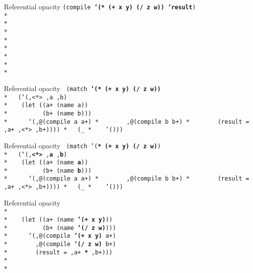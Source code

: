 \begin{frame}{Referential opacity}
  \texttt{(compile \textbf{'(* (+ x y) (/ z w)) 'result})\\*
    \ \\*
    \ \\*
    \ \\*
    \ \\*
    \ \\*
    \ \\*
    \ \\*
    \ }
\end{frame}

\begin{frame}{Referential opacity}
  \texttt{
    (match \textbf{'(* (+ x y) (/ z w))}\\*
    \ \ (`(,<*> ,a ,b)\\*
    \ \ \ (let ((a+ (name a))\\*
    \ \ \ \ \ \ \ \ \ (b+ (name b)))\\*
    \ \ \ \ \ `(,@(compile a a+)\\*
    \ \ \ \ \ \ \ ,@(compile b b+)\\*
    \ \ \ \ \ \ \ (\textbf{result} = ,a+ ,<*> ,b+))))\\*
    \ \ (\_\\*
    \ \ \ '()))
}
\end{frame}

\begin{frame}{Referential opacity}
  \texttt{
    (match '(\textbf{*} \textbf{(+ x y)} \textbf{(/ z w)})\\*
    \ \ (`(,\textbf{<*>} ,\textbf{a} ,\textbf{b})\\*
    \ \ \ (let ((a+ (name \textbf{a}))\\*
    \ \ \ \ \ \ \ \ \ (b+ (name \textbf{b})))\\*
    \ \ \ \ \ `(,@(compile \textbf{a} a+)\\*
    \ \ \ \ \ \ \ ,@(compile \textbf{b} b+)\\*
    \ \ \ \ \ \ \ (result = ,a+ ,\textbf{<*>} ,b+))))\\*
    \ \ (\_\\*
    \ \ \ '()))
}
\end{frame}

\begin{frame}{Referential opacity}
  \texttt{
    \ \\*
    \ \\*
    \ \ \ (let ((a+ (name \textbf{'(+ x y)}))\\*
    \ \ \ \ \ \ \ \ \ (b+ (name \textbf{'(/ z w)})))\\*
    \ \ \ \ \ `(,@(compile \textbf{'(+ x y)} a+)\\*
    \ \ \ \ \ \ \ ,@(compile \textbf{'(/ z w)} b+)\\*
    \ \ \ \ \ \ \ (result = ,a+ \textbf{*} ,b+))) \\*
    \ \\*
    \ 
  }
\end{frame}


